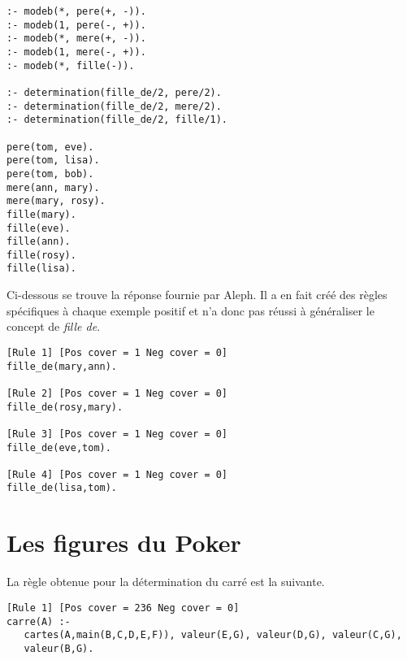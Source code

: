 \documentclass[a4paper,12pt]{article}
\begin{document}
\begin{lstlisting}[frame=single]
:- modeb(*, pere(+, -)).
:- modeb(1, pere(-, +)).
:- modeb(*, mere(+, -)).
:- modeb(1, mere(-, +)).
:- modeb(*, fille(-)).

:- determination(fille_de/2, pere/2).
:- determination(fille_de/2, mere/2).
:- determination(fille_de/2, fille/1).

pere(tom, eve).
pere(tom, lisa).
pere(tom, bob).
mere(ann, mary).
mere(mary, rosy).
fille(mary).
fille(eve).
fille(ann).
fille(rosy).
fille(lisa).
\end{lstlisting}

Ci-dessous se trouve la réponse fournie par Aleph. Il a en fait créé des règles spécifiques à chaque exemple positif et n'a donc pas réussi à généraliser le concept de \textit{fille de}.

\begin{lstlisting}[frame=single]
[Rule 1] [Pos cover = 1 Neg cover = 0]
fille_de(mary,ann).

[Rule 2] [Pos cover = 1 Neg cover = 0]
fille_de(rosy,mary).

[Rule 3] [Pos cover = 1 Neg cover = 0]
fille_de(eve,tom).

[Rule 4] [Pos cover = 1 Neg cover = 0]
fille_de(lisa,tom).
\end{lstlisting}

\section{Les figures du Poker}

La règle obtenue pour la détermination du carré est la suivante.

\begin{lstlisting}[frame=single]
[Rule 1] [Pos cover = 236 Neg cover = 0]
carre(A) :-
   cartes(A,main(B,C,D,E,F)), valeur(E,G), valeur(D,G), valeur(C,G), 
   valeur(B,G).
\end{lstlisting}
\end{document}
